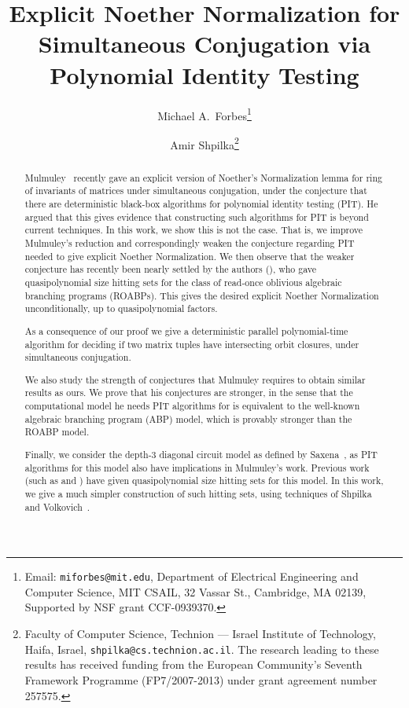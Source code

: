 \documentclass[letterpaper,11pt]{article}
\numberwithin{equation}{section}
\theoremstyle{plain}
\theoremstyle{remark}
\begin{document}
\title{Explicit Noether Normalization for Simultaneous Conjugation via Polynomial Identity Testing}
\author{%
Michael A.\ Forbes\thanks{Email: \texttt{miforbes@mit.edu},
Department of Electrical Engineering and Computer Science, MIT CSAIL, 32 Vassar St.,
Cambridge, MA 02139, Supported by NSF grant CCF-0939370.}
		\and
Amir Shpilka\thanks{Faculty of Computer Science, Technion --- Israel Institute of Technology, Haifa, Israel,
\texttt{shpilka@cs.technion.ac.il}.  The research leading to these results has received funding
from the European Community's Seventh Framework Programme (FP7/2007-2013) under grant agreement number 257575.}}
\maketitle


\begin{abstract}
	Mulmuley~\cite{Mulmuley12} recently gave an explicit version of Noether's Normalization lemma for ring of invariants of matrices under simultaneous conjugation, under the conjecture that there are deterministic black-box algorithms for polynomial identity testing (PIT).  He argued that this gives evidence that constructing such algorithms for PIT is beyond current techniques.  In this work, we show this is not the case.  That is, we improve Mulmuley's reduction and correspondingly weaken the conjecture regarding PIT needed to give explicit Noether Normalization.  We then observe that the weaker conjecture has recently been nearly settled by the authors (\cite{ForbesShpilka12a}), who gave quasipolynomial size hitting sets for the class of read-once oblivious algebraic branching programs (ROABPs).  This gives the desired explicit Noether Normalization unconditionally, up to quasipolynomial factors.

	As a consequence of our proof we give a deterministic parallel polynomial-time algorithm for deciding if two matrix tuples have intersecting orbit closures, under simultaneous conjugation.  

	We also study the strength of conjectures that Mulmuley requires to obtain similar results as ours.  We prove that his conjectures are stronger, in the sense that the computational model he needs PIT algorithms for is equivalent to the well-known algebraic branching program (ABP) model, which is provably stronger than the ROABP model.


	Finally, we consider the depth-3 diagonal circuit model as defined by Saxena~\cite{Saxena08}, as PIT algorithms for this model also have implications in Mulmuley's work.  Previous work (such as \cite{AgrawalSS12} and \cite{ForbesShpilka12a}) have given quasipolynomial size hitting sets for this model.  In this work, we give a much simpler construction of such hitting sets, using techniques of Shpilka and Volkovich~\cite{ShpilkaVolkovich09}.
\end{abstract}
\end{document}
